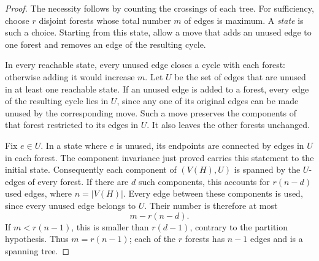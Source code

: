 \begin{proof}
The necessity follows by counting the crossings of each tree.
For sufficiency, choose \(r\) disjoint forests whose total number
\(m\) of edges is maximum. A \emph{state} is such a choice.
Starting from this state, allow a move that adds an unused edge to
one forest and removes an edge of the resulting cycle.

In every reachable state, every unused edge closes a cycle with
each forest: otherwise adding it would increase \(m\).
Let \(U\) be the set of edges that are unused in at least one reachable
state. If an unused edge is added to a forest, every edge of the
resulting cycle lies in \(U\), since any one of its original edges
can be made unused by the corresponding move.
Such a move preserves the components of that forest restricted to
its edges in \(U\). It also leaves the other forests unchanged.

Fix \(e\in U\). In a state where \(e\) is unused, its endpoints are
connected by edges in \(U\) in each forest. The component invariance
just proved carries this statement to the initial state.
Consequently each component of \((V(H),U)\) is spanned by the
\(U\)-edges of every forest.
If there are \(d\) such components, this accounts for \(r(n-d)\)
used edges, where \(n=|V(H)|\).
Every edge between these components is used, since every unused
edge belongs to \(U\). Their number is therefore at most
\[
 m-r(n-d).
\]
If \(m<r(n-1)\), this is smaller than \(r(d-1)\), contrary to the
partition hypothesis. Thus \(m=r(n-1)\); each of the \(r\) forests
has \(n-1\) edges and is a spanning tree.
\end{proof}

